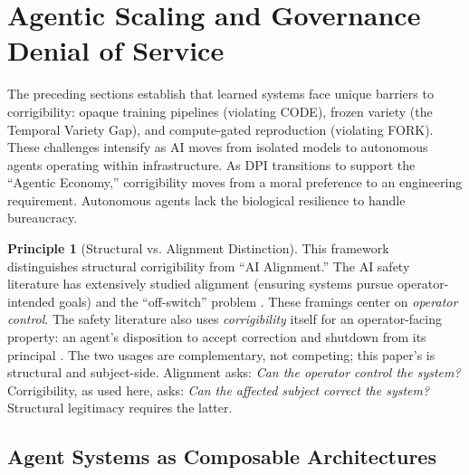 \documentclass{article}
\theoremstyle{definition}
\newtheorem{principle}{Principle}[section]
\begin{document}

\section{Agentic Scaling and Governance Denial of Service}
\label{sec:agentic}

The preceding sections establish that learned systems face unique barriers to corrigibility: opaque training pipelines (violating CODE), frozen variety (the Temporal Variety Gap), and compute-gated reproduction (violating FORK). These challenges intensify as AI moves from isolated models to autonomous agents operating within infrastructure. As DPI transitions to support the ``Agentic Economy,'' corrigibility moves from a moral preference to an engineering requirement. Autonomous agents lack the biological resilience to handle bureaucracy.

\begin{principle}[Structural vs. Alignment Distinction]
This framework distinguishes structural corrigibility from ``AI Alignment.'' The AI safety literature has extensively studied alignment (ensuring systems pursue operator-intended goals) \citep{soares2017} and the ``off-switch'' problem \citep{hadfield2017}. These framings center on \textit{operator control}. The safety literature also uses \textit{corrigibility} itself for an operator-facing property: an agent's disposition to accept correction and shutdown from its principal \citep{soares2015}. The two usages are complementary, not competing; this paper's is structural and subject-side. Alignment asks: \textit{Can the operator control the system?} Corrigibility, as used here, asks: \textit{Can the affected subject correct the system?} Structural legitimacy requires the latter.
\end{principle}

\subsection{Agent Systems as Composable Architectures}
\label{subsec:agent-systems}
\end{document}
